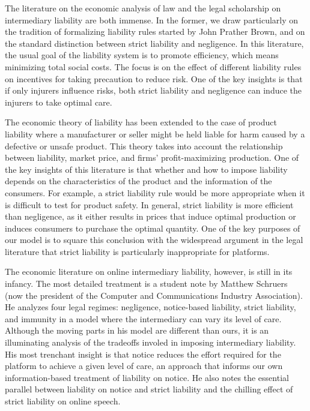 \label{sec:background}

The literature on the economic analysis of law and the legal scholarship on intermediary liability are both immense. In the former, we draw particularly on the tradition of formalizing liability rules started by John Prather Brown, and on the standard distinction between strict liability and negligence. In this literature, the usual goal of the liability system is to promote efficiency, which means minimizing total social costs. The focus is on the effect of different liability rules on incentives for taking precaution to reduce risk. One of the key insights is that if only injurers influence risks, both strict liability and negligence can induce the injurers to take optimal care.  

The economic theory of liability has been extended to the case of product liability where a manufacturer or seller might be held liable for harm caused by a defective or unsafe product.  This theory takes into account the relationship between liability, market price, and firms' profit-maximizing production. One of the key insights of this literature is that whether and how to impose liability depends on the characteristics of the product and the information of the consumers. For example, a strict liability rule would be more appropriate when it is difficult to test for product safety. In general, strict liability is more efficient than negligence, as it either results in prices that induce optimal production or induces consumers to purchase the optimal quantity. One of the key purposes of our model is to square this conclusion with the widespread argument in the legal literature that strict liability is particularly inappropriate for platforms.

The economic literature on online intermediary liability, however, is still in its infancy. The most detailed treatment is a student note by Matthew Schruers (now the president of the Computer and Communications Industry Association). He analyzes four legal regimes: negligence, notice-based liability, strict liability, and immunity in a model where the intermediary can vary its level of care. Although the moving parts in his model are different than ours, it is an illuminating analysis of the tradeoffs involed in imposing intermediary liability. His most trenchant insight is that notice reduces the effort required for the platform to achieve a given level of care, an approach that informs our own information-based treatment of liability on notice. He also notes the essential parallel between liability on notice and strict liability and the chilling effect of strict liability on online speech. 

